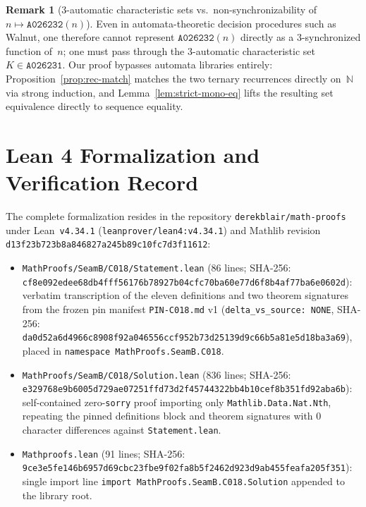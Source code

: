 \documentclass[11pt]{article}
\theoremstyle{definition}
\newtheorem{remark}[theorem]{Remark}
\newcommand{\N}{\mathbb{N}}
\newcommand{\seq}[1]{\texttt{#1}}
\begin{document}
\begin{remark}[3-automatic characteristic sets vs.\ non-synchronizability of $n \mapsto \seq{A026232}(n)$]
Even in automata-theoretic decision procedures such as Walnut, one therefore cannot represent $\seq{A026232}(n)$ directly as a $3$-synchronized function of~$n$; one must pass through the $3$-automatic characteristic set $K \in \seq{A026231}$. Our proof bypasses automata libraries entirely: Proposition~\ref{prop:rec-match} matches the two ternary recurrences directly on~$\N$ via strong induction, and Lemma~\ref{lem:strict-mono-eq} lifts the resulting set equivalence directly to sequence equality.
\end{remark}

\section{Lean 4 Formalization and Verification Record}
\label{sec:lean}

The complete formalization resides in the repository \texttt{derekblair/math-proofs} under Lean~\texttt{v4.34.1} (\nolinkurl{leanprover/lean4:v4.34.1}) and Mathlib revision
{\small\nolinkurl{d13f23b723b8a846827a245b89c10fc7d3f11612}}:
\begin{itemize}
\item \nolinkurl{MathProofs/SeamB/C018/Statement.lean} (86 lines; SHA-256:\\
{\small\nolinkurl{cf8e092edee68db4fff56176b78927b04cfc70ba60e77d6f8b4af77ba6e0602d}}):\\
verbatim transcription of the eleven definitions and two theorem signatures from the frozen pin manifest \texttt{PIN-C018.md} v1 (\texttt{delta\_vs\_source: NONE}, SHA-256:\\
{\small\nolinkurl{da0d52a6d4966c8908f92a046556ccf952b73d25139d9c66b5a81e5d18ba3a69}}), placed in \texttt{namespace MathProofs.SeamB.C018}.
\item \nolinkurl{MathProofs/SeamB/C018/Solution.lean} (836 lines; SHA-256:\\
{\small\nolinkurl{e329768e9b6005d729ae07251ffd73d2f45744322bb4b10cef8b351fd92aba6b}}):\\
self-contained zero-\texttt{sorry} proof importing only \nolinkurl{Mathlib.Data.Nat.Nth}, repeating the pinned definitions block and theorem signatures with $0$ character differences against \texttt{Statement.lean}.
\item \nolinkurl{Mathproofs.lean} (91 lines; SHA-256:\\
{\small\nolinkurl{9ce3e5fe146b6957d69cbc23fbe9f02fa8b5f2462d923d9ab455feafa205f351}}):\\
single import line \texttt{import MathProofs.SeamB.C018.Solution} appended to the library root.
\end{itemize}
\end{document}
